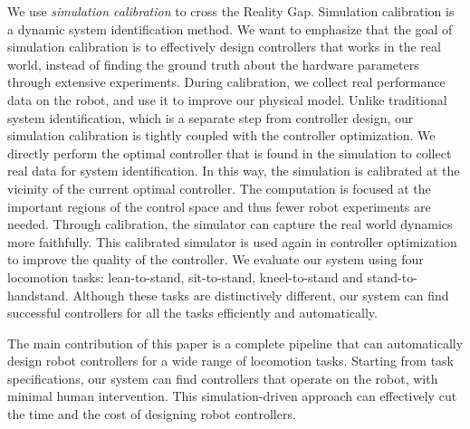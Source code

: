 
We use \emph{simulation calibration} to cross the Reality Gap. Simulation calibration is a dynamic system identification method. We want to emphasize that the goal of simulation calibration is to effectively design controllers that works in the real world, instead of finding the ground truth about the hardware parameters through extensive experiments. During calibration, we collect real performance data on the robot, and use it to improve our physical model. Unlike traditional system identification, which is a separate step from controller design, our simulation calibration is tightly coupled with the controller optimization. We directly perform the optimal controller that is found in the simulation to collect real data for system identification. In this way, the simulation is calibrated at the vicinity of the current optimal controller. The computation is focused at the important regions of the control space and thus fewer robot experiments are needed. Through calibration, the simulator can capture the real world dynamics more faithfully. This calibrated simulator is used again in controller optimization to improve the quality of the controller. We evaluate our system using four locomotion tasks: lean-to-stand, sit-to-stand, kneel-to-stand and stand-to-handstand. Although these tasks are distinctively different, our system can find successful controllers for all the tasks efficiently and automatically. 

The main contribution of this paper is a complete pipeline that can automatically design robot controllers for a wide range of locomotion tasks. Starting from task specifications, our system can find controllers that operate on the robot, with minimal human intervention. This simulation-driven approach can effectively cut the time and the cost of designing robot controllers. 
